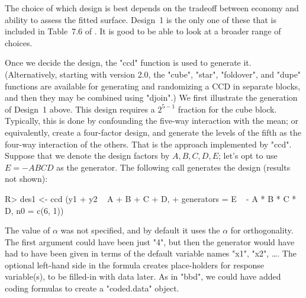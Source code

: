 \documentclass[article,nojss]{jss}
\begin{document}
The choice of which design is best depends on the tradeoff between economy and ability to assess the fitted surface.  Design~1 is the only one of these that is included in Table~7.6 of \cite{Mye09}.  It is good to be able to look at a broader range of choices.

Once we decide the design, the "ccd" function is used to generate it. (Alternatively, starting with  version 2.0, the "cube", "star", "foldover", and "dupe" functions are available for generating and randomizing a CCD in separate blocks, and then they may be combined using "djoin".)
We first illustrate the generation of Design~1 above.  This design requires a $2^{5-1}$ fraction for the cube block.  Typically, this is done by confounding the five-way interaction with the mean; or equivalently, create a four-factor design, and generate the levels of the fifth as the four-way interaction of the others.  That is the approach implemented by "ccd".
Suppose that we denote the design factors by $A,B,C,D,E$; let's opt to use $E=-ABCD$ as the generator.  The following call generates the design (results not shown):
\begin{Schunk}
\begin{Sinput}
R> des1 <- ccd (y1 + y2 ~ A + B + C + D,
+   generators = E ~ - A * B * C * D, n0 = c(6, 1))
\end{Sinput}
\end{Schunk}
The value of $\alpha$ was not specified, and by default it uses the $\alpha$ for orthogonality.  The first argument could have been just "4", but then the generator would have had to have been given in terms of the default variable names "x1", "x2", \ldots.  The optional left-hand side in the formula creates place-holders for response variable(s), to be filled-in with data later.  As in "bbd", we could have added coding formulas to create a "coded.data" object. 
\end{document}
